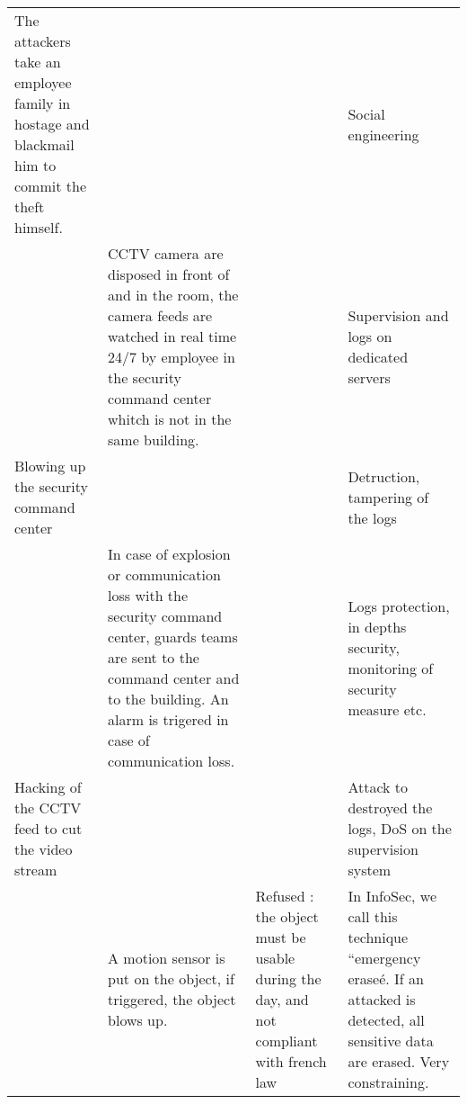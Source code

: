 \documentclass[11pt]{article} %
\begin{document}
\begin{longtable}{|p{3cm}|p{3cm}|p{3cm}|p{3cm}|}
The attackers take an employee family in hostage and blackmail him to 
commit the theft himself. & & & Social engineering \\
& CCTV camera are disposed in front of and in the room, the camera feeds are 
watched in real time 24/7 by employee in the security command center whitch is not 
in the same building. & & Supervision and logs on dedicated servers \\
Blowing up the security command center & & & Detruction, tampering of the logs \\
& In case of explosion or communication loss with the security command center, 
guards teams are sent to the command center and to the building. An alarm is trigered 
in case of communication loss. & & Logs protection, in depths security, monitoring of security
measure etc. \\
Hacking of the CCTV feed to cut the video stream & & & Attack to destroyed the logs, 
DoS on the supervision system \\
& A motion sensor is put on the object, if triggered, the object blows up. & Refused : the
object must be usable during the day, and not compliant with french law & In InfoSec, 
we call this technique ``emergency eraseé. If an attacked is detected, all sensitive data
are erased. Very constraining. \\

\end{longtable}
\end{document}
